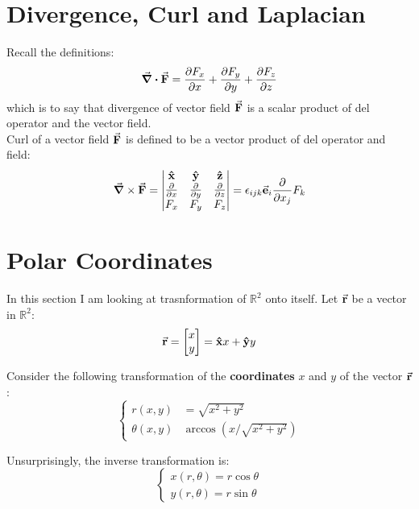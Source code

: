 \documentclass[12pt]{article}
\begin{document}
\section{Divergence, Curl and Laplacian}
Recall the definitions:
\begin{equation}
\div \va{F} = 
\frac{\partial F_x}{\partial x} + 
\frac{\partial F_y}{\partial y} + 
\frac{\partial F_z}{\partial z}
\end{equation}
which is to say that divergence of vector field $\va{F}$ is a scalar product of 
del operator and the vector field.
\\ \indent Curl of a vector field $\va{F}$ is defined to be a vector product of del operator and field:
\begin{equation*}
\grad \times \va{F} = 
\begin{vmatrix}
\vu{x} & \vu{y} & \vu{z} \\
\frac{\partial}{\partial x} & \frac{\partial}{\partial y} & 
\frac{\partial}{\partial z} \\
F_x & F_y & F_z
\end{vmatrix} = 
\epsilon_{ijk} \va{e}_i \frac{\partial}{\partial x_j} F_k
\end{equation*}


\section{Polar Coordinates}
In this section I am looking at trasnformation of $\mathbb{R}^2$ onto itself.
Let $\va{r}$ be a vector in $\mathbb{R}^2$:
\begin{equation}
\va{r} = \begin{bmatrix}
x \\ y
\end{bmatrix} = 
\vu{x}x + \vu{y}y
\end{equation}

\noindent
Consider the following transformation of the \textbf{coordinates} $x$ and $y$ of the 
vector $\va{r}$:
\begin{equation}
\label{polar_coors_transform}
	\begin{cases}
		r(x,y) &= \sqrt{x^2 + y^2} \\
		\theta (x, y) & \arccos (x / \sqrt{x^2+ y^2})
	\end{cases}
\end{equation}

Unsurprisingly, the inverse transformation is:
\begin{equation}
\label{polar_coors_inv_transform}
	\begin{cases}
		x(r, \theta) = r \cos \theta \\
		y(r, \theta) = r \sin \theta
	\end{cases}
\end{equation}
\end{document}
